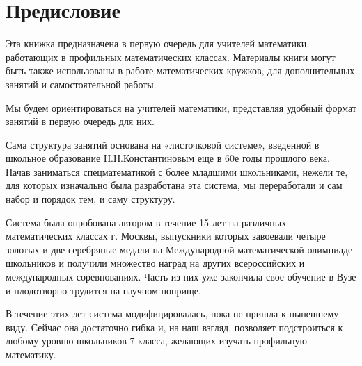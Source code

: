 
		\section{Предисловие}

	Эта книжка предназначена в первую очередь для учителей математики, работающих в профильных математических классах. Материалы книги могут быть также использованы в работе математических кружков, для дополнительных занятий и самостоятельной работы.
	
	Мы будем ориентироваться на учителей математики, представляя удобный формат занятий в первую очередь для них.
	
Сама структура занятий основана на «листочковой системе», введенной в школьное образование Н.Н.Константиновым еще в 60е годы прошлого века. Начав заниматься спецматематикой с более младшими школьниками, нежели те, для которых изначально была разработана эта система, мы переработали и сам набор и порядок тем, и саму структуру.
	 
Система была опробована автором в течение 15 лет на различных математических классах г. Москвы, выпускники которых завоевали четыре золотых и две серебряные медали на Международной математической олимпиаде школьников и получили множество наград на других всероссийских и международных соревнованиях. Часть из них уже закончила свое обучение в Вузе и плодотворно трудится на научном поприще.
	
В течение этих лет система модифицировалась, пока не пришла к нынешнему виду. Сейчас она достаточно гибка и, на наш взгляд, позволяет подстроиться к любому уровню школьников 7 класса, желающих изучать профильную математику.
	
